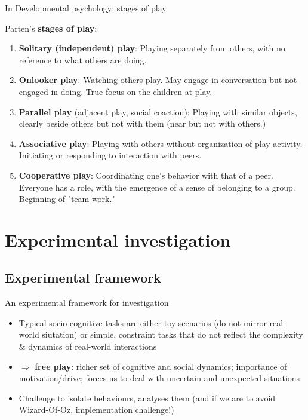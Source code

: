 \documentclass[compress]{beamer}
\begin{document}
{
\begin{frame}{In Developmental psychology: stages of play}

    Parten's {\bf stages of play}:

    \begin{enumerate}
        \item<1-> {\bf Solitary (independent) play}: Playing separately from
            others, with no reference to what others are doing.
        \item<2-> {\bf Onlooker play}: Watching others play. May engage in
            conversation but not engaged in doing. True focus on the children at
            play.
        \item<3-> {\bf Parallel play} (adjacent play, social coaction): Playing
            with similar objects, clearly beside others but not with them (near
            but not with others.)
        \item<4-> {\bf Associative play}:  Playing with others without
            organization of play activity. Initiating or responding to
            interaction with peers. 
        \item<5-> {\bf Cooperative play}: Coordinating one’s behavior with that
            of a peer. Everyone has a role, with the emergence of a sense of
            belonging to a group. Beginning of "team work."
    \end{enumerate}

\end{frame}
}

\section{Experimental investigation}

\subsection{Experimental framework}
\begin{frame}{An experimental framework for investigation}

    \begin{itemize}
        \item<1-> Typical socio-cognitive tasks are either toy scenarios (\ie do not mirror
            real-world siutation) or simple, constraint tasks that do not
            reflect the complexity \& dynamics of real-world interactions
        \item<2-> $\Rightarrow$ {\bf free play}: richer set of cognitive and
            social dynamics; importance of motivation/drive; forces us to deal
            with uncertain and unexpected situations
        \item<3-> Challenge to isolate behaviours, analyses them (and if we are
            to avoid Wizard-Of-Oz, implementation challenge!)
    \end{itemize}
\end{frame}
\end{document}
